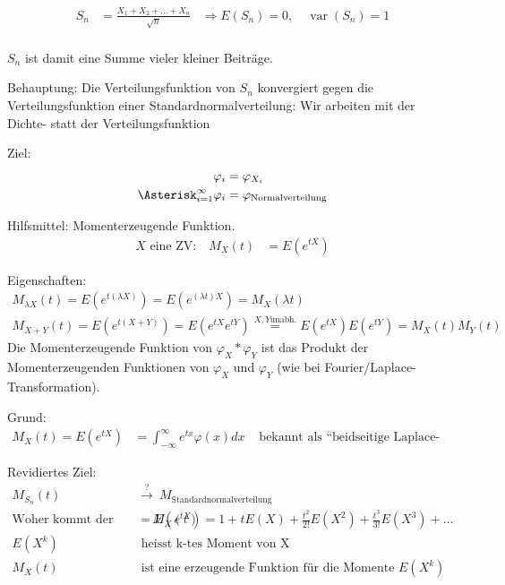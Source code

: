 \documentclass[10pt,a4paper]{scrartcl}
\newif\ifincludeDerivations
\DeclareMathOperator{\var}{var}
\begin{document}
\fi
\ifincludeDerivations

\begin{align*}
    S_n & = \frac{X_1 + X_2 + \dots + X_n}{\sqrt{n}} &\Rightarrow E(S_n) = 0,\quad \var(S_n) = 1 \\
\end{align*}

$S_n$ ist damit eine Summe vieler kleiner Beiträge.

Behauptung: Die Verteilungsfunktion von $S_n$ konvergiert gegen die Verteilungsfunktion einer Standardnormalverteilung:
Wir arbeiten mit der Dichte- statt der Verteilungsfunktion

Ziel: 
\begin{align*}
\varphi_i & = \varphi_{X_i}\\
\Asterisk_{i=1}^\infty \varphi_i & = \varphi_{\text{Normalverteilung}} %
\end{align*}

Hilfsmittel: Momenterzeugende Funktion.
\begin{align*}
X \text{ eine ZV:} \quad M_X(t) & = E(e^{tX})
\end{align*}

Eigenschaften:
\begin{align*}
M_{\lambda X}(t) = E(e^{t(\lambda X)}) = E(e^{(\lambda t) X}) = M_X(\lambda t) \\
M_{X+Y}(t) = E(e^{t(X+Y)}) = E(e^{tX} e^{tY}) \stackrel{X,Y \text{unabh.}}{=} E(e^{tX}) E(e^{tY}) = M_X(t)M_Y(t)
\end{align*}
Die Momenterzeugende Funktion von $\varphi_X*\varphi_Y$ ist das Produkt der Momenterzeugenden Funktionen von $\varphi_X$ und $\varphi_Y$ (wie bei Fourier/Laplace-Transformation). 

Grund: 
\begin{align*}
M_X(t) = E(e^{tX}) & = \int_{-\infty}^\infty e^{tx} \varphi(x) dx & \text{ bekannt als ``beidseitige Laplace-Transformation''}
\end{align*}

Revidiertes Ziel:
\begin{align*}
M_{S_n}(t) \ &\stackrel{?}{\longrightarrow}\  M_{\text{Standardnormalverteilung}} \\
\text{Woher kommt der Name?}\qquad M_X(t) & = E(e^{tX}) = 1 + tE(X) + \frac{t^2}{2!}E(X^2) + \frac{t^3}{3!} E(X^3) + \dots \\
E(X^k) & \text{ heisst k-tes Moment von X} \\
M_X(t) &\text{ ist eine erzeugende Funktion für die Momente } E(X^k)
\end{align*}
\end{document}

